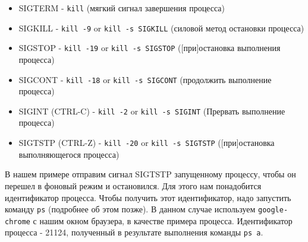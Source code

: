 \documentclass{article}
\begin{document}
\begin{itemize}
\tightlist
\item
  SIGTERM - \texttt{kill} (мягкий сигнал завершения процесса)
\item
  SIGKILL - \texttt{kill\ -9} or \texttt{kill\ -s\ SIGKILL} (силовой
  метод остановки процесса)
\item
  SIGSTOP - \texttt{kill\ -19} or \texttt{kill\ -s\ SIGSTOP}
  ({[}при{]}остановка выполнения процесса)
\item
  SIGCONT - \texttt{kill\ -18} or \texttt{kill\ -s\ SIGCONT} (продолжить
  выполнение процесса)
\item
  SIGINT (CTRL-C) - \texttt{kill\ -2} or \texttt{kill\ -s\ SIGINT}
  (Прервать выполнение процесса)
\item
  SIGTSTP (CTRL-Z) - \texttt{kill\ -20} or \texttt{kill\ -s\ SIGTSTP}
  ({[}при{]}остановка выполняющегося процесса)
\end{itemize}

В нашем примере отправим сигнал SIGTSTP запущенному процессу, чтобы он
перешел в фоновый режим и остановился. Для этого нам понадобится
идентификатор процесса. Чтобы получить этот идентификатор, надо
запустить команду \texttt{ps} (подробнее об этом позже). В данном случае
используем \texttt{google-chrome} с нашим окном браузера, в качестве
примера процесса. Идентификатор процесса - 21124, полученный в
результате выполнения команды \texttt{ps\ a}.
\end{document}
